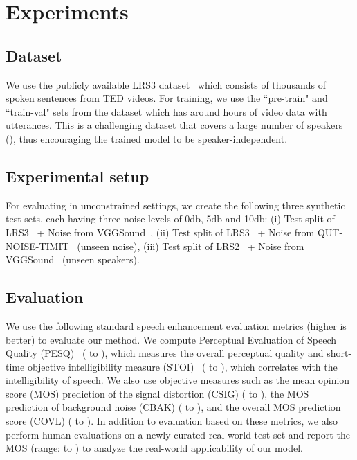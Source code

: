 \documentclass[10pt,twocolumn,letterpaper]{article}
\begin{document}
 

\section{Experiments}
\label{section:experiments} 


\subsection{Dataset}
We use the publicly available LRS3 dataset~\cite{Afouras18d} which consists of thousands of spoken sentences from TED videos. For training, we use the ``pre-train" and ``train-val" sets from the dataset which has around  hours of video data with  utterances. This is a challenging dataset that covers a large number of speakers (), thus encouraging the trained model to be speaker-independent.

\subsection{Experimental setup}
\label{setup}
For evaluating in unconstrained settings, we create the following three synthetic test sets, each having three noise levels of 0db, 5db and 10db: (i) Test split of LRS3~\cite{Afouras18d} + Noise from VGGSound~\cite{9053174}, (ii) Test split of LRS3~\cite{Afouras18d} + Noise from QUT-NOISE-TIMIT~\cite{Dean2010TheQC} (unseen noise), (iii) Test split of LRS2~\cite{Afouras18c} + Noise from VGGSound~\cite{9053174} (unseen speakers). 

\subsection{Evaluation}
\label{subsection:test_sets}
We use the following standard speech enhancement evaluation metrics (higher is better) to evaluate our method. We compute Perceptual Evaluation of Speech Quality (PESQ)~\cite{rix2001perceptual} ( to ), which measures the overall perceptual quality and short-time objective intelligibility measure (STOI)~\cite{taal2010short} ( to ), which correlates with the intelligibility of speech. We also use objective measures such as the mean opinion score (MOS) prediction of the signal distortion (CSIG) ( to ), the MOS prediction of background noise (CBAK) ( to ), and the overall MOS prediction score (COVL) ( to ). In addition to evaluation based on these metrics, we also perform human evaluations on a newly curated real-world test set and report the MOS (range:  to ) to analyze the real-world applicability of our model.
\end{document}

